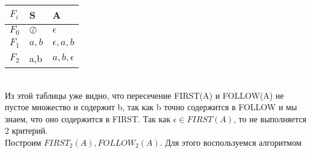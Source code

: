 \documentclass[a4paper,12pt]{article}
\begin{document}
\begin{tabular}{  || l | l |l|| }
\hline
$F_i$ & S& A  \\ \hline
$F_0$ & $\oslash$&$\epsilon$  \\ \hline
$F_1$ & $a,b$& $\epsilon,a,b$  \\ \hline
$F_2$ & a,b& $a,b,\epsilon$  \\ \hline
\hline
\end{tabular}\\
Из этой таблицы уже видно, что пересечение FIRST(A) и FOLLOW(A) не пустое множество и содержит b, так как b точно содержится в FOLLOW и мы знаем, что оно содержится в FIRST. Так как $\epsilon \in FIRST(A)$, то не выполняется 2 критерий.\\
Построим $FIRST_2(A), FOLLOW_2(A)$. Для этого воспользуемся алгоритмом\\
\end{document}
